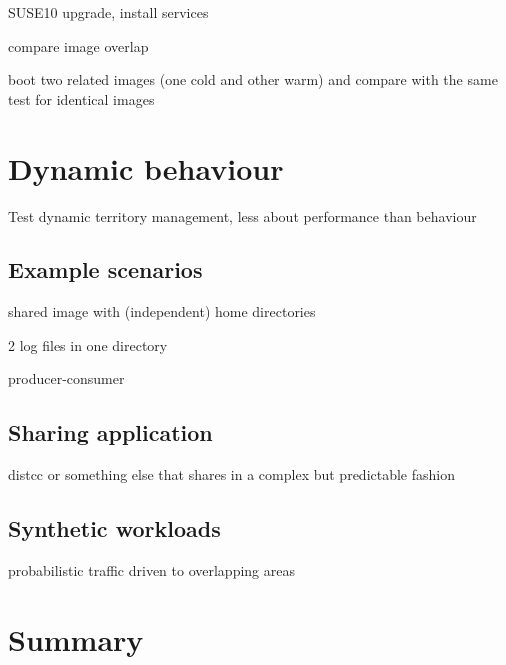 SUSE10 upgrade, install services

compare image overlap

boot two related images (one cold and other warm) and compare with the same test for identical images

\section{Dynamic behaviour}

Test dynamic territory management, less about performance than behaviour

\subsection{Example scenarios}

shared image with (independent) home directories

2 log files in one directory

producer-consumer

\subsection{Sharing application}
distcc or something else that shares in a complex but predictable fashion

\subsection{Synthetic workloads}

probabilistic traffic driven to overlapping areas

\section{Summary}
